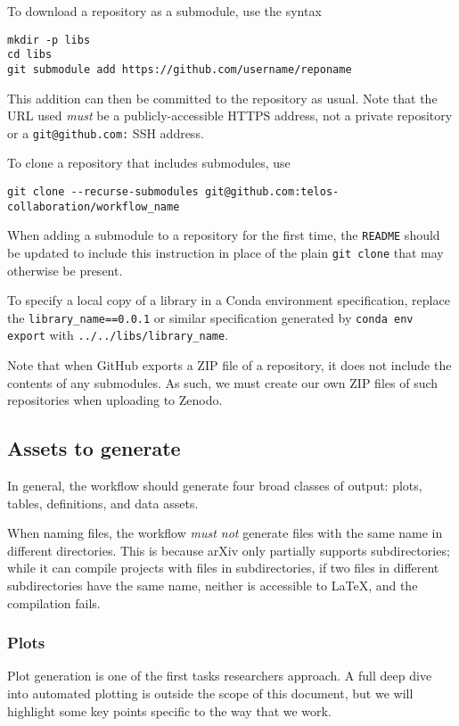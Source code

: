 \documentclass{article}
\newcommand\rfcword[1]{\emph{#1}\xspace}
\newcommand\must{\rfcword{must}}
\newcommand\mustnot{\rfcword{must not}}
\newcommand\filename[1]{\texttt{#1}\xspace}
\newcommand\readme{\filename{README}\xspace}
\begin{document}
To download a repository as a submodule,
use the syntax
\begin{verbatim}
mkdir -p libs
cd libs
git submodule add https://github.com/username/reponame
\end{verbatim}
This addition can then be committed to the repository as usual.
Note that the URL used \must be a publicly-accessible HTTPS address,
not a private repository or a \texttt{git@github.com:} SSH address.

To clone a repository that includes submodules,
use
\begin{verbatim}
git clone --recurse-submodules git@github.com:telos-collaboration/workflow_name
\end{verbatim}
When adding a submodule to a repository for the first time,
the \readme should be updated to include this instruction in place of
the plain \texttt{git clone} that may otherwise be present.

To specify a local copy of a library in a Conda environment specification,
replace the \verb|library_name==0.0.1| or similar specification
generated by \texttt{conda env export}
with \verb|../../libs/library_name|.

Note that when GitHub exports a ZIP file of a repository,
it does not include the contents of any submodules.
As such,
we must create our own ZIP files of such repositories when uploading to Zenodo.

\subsection{Assets to generate}

In general,
the workflow should generate four broad classes of output:
plots,
tables,
definitions,
and data assets.

When naming files,
the workflow \mustnot generate files with the same name in different directories.
This is because arXiv only partially supports subdirectories;
while it can compile projects with files in subdirectories,
if two files in different subdirectories have the same name,
neither is accessible to LaTeX,
and the compilation fails.

\subsubsection{Plots}

Plot generation is one of the first tasks researchers approach.
A full deep dive into automated plotting is outside the scope of this document,
but we will highlight some key points specific to the way that we work.
\end{document}
